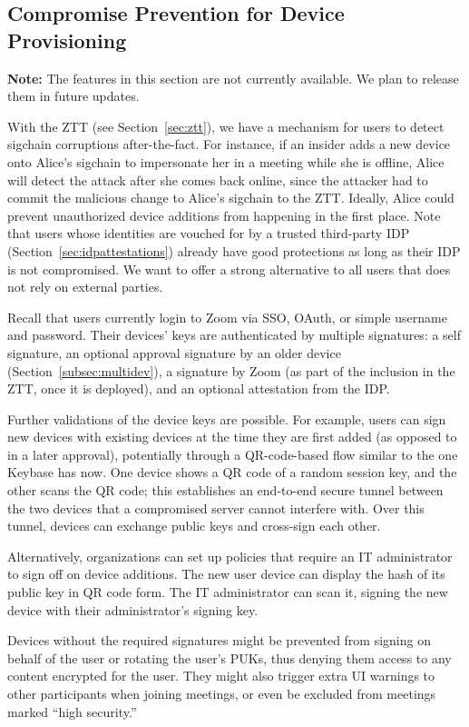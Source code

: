 \subsection{Compromise Prevention for Device Provisioning}\label{subsec:realtime} \textbf{Note: }
The features in this section are not currently available. We plan to release them in future updates.

With the ZTT (see Section~\ref{sec:ztt}), we have a mechanism for users to detect sigchain
corruptions after-the-fact. For instance, if an insider adds a new device onto Alice's sigchain to
impersonate her in a meeting while she is offline, Alice will detect the attack after she comes back
online, since the attacker had to commit the malicious change to Alice's sigchain to the ZTT.
Ideally, Alice could prevent unauthorized device additions from happening in the first place. Note
that users whose identities are vouched for by a trusted third-party IDP
(Section~\ref{sec:idpattestations}) already have good protections as long as their IDP is not
compromised. We want to offer a strong alternative to all users that does not rely on external
parties.

Recall that users currently login to Zoom via SSO, OAuth, or simple username and password. Their
devices' keys are authenticated by multiple signatures: a self signature, an optional approval
signature by an older device (Section~\ref{subsec:multidev}), a signature by Zoom (as part of the
inclusion in the ZTT, once it is deployed), and an optional attestation from the IDP.

Further validations of the device keys are possible. For example, users can sign new devices with
existing devices at the time they are first added (as opposed to in a later approval), potentially
through a QR-code-based flow similar to the one Keybase has now. One device shows a QR code of a
random session key, and the other scans the QR code; this establishes an end-to-end secure tunnel
between the two devices that a compromised server cannot interfere with. Over this tunnel, devices
can exchange public keys and cross-sign each other.

Alternatively, organizations can set up policies that require an IT administrator to sign off on
device additions. The new user device can display the hash of its public key in QR code form. The IT
administrator can scan it, signing the new device with their administrator's signing key.

Devices without the required signatures might be prevented from signing on behalf of the user or
rotating the user's PUKs, thus denying them access to any content encrypted for the user. They might
also trigger extra UI warnings to other participants when joining meetings, or even be excluded from
meetings marked ``high security.''
